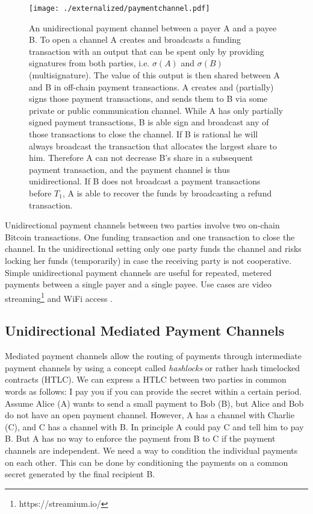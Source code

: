 \begin{figure}
\texttt{[image: ./externalized/paymentchannel.pdf]}
\caption{An unidirectional payment channel between a payer A and a payee B. To open a channel A creates and broadcasts a funding transaction with an output that can be spent only by providing signatures from both parties, i.e. $\sigma(A)$ and $\sigma(B)$ (multisignature). The value of this output is then shared between A and B in off-chain payment transactions. A creates and (partially) signs those payment transactions, and sends them to B via some private or public communication channel. While A has only partially signed payment transactions, B is able sign and broadcast any of those transactions to close the channel. If B is rational he will always broadcast the transaction that allocates the largest share to him. Therefore A can not decrease B's share in a subsequent payment transaction, and the payment channel is thus unidirectional. If B does not broadcast a payment transactions before $T_1$, A is able to recover the funds by broadcasting a refund transaction.}
\label{fig:paymentchannels}
\end{figure}

Unidirectional payment channels between two parties involve two on-chain Bitcoin transactions. One funding transaction and one transaction to close the channel. In the unidirectional setting only one party funds the channel and risks locking her funds (temporarily) in case the receiving party is not cooperative. Simple unidirectional payment channels are useful for repeated, metered payments between a single payer and a single payee. Use cases are video streaming\footnote{https://streamium.io/} and WiFi access \cite{Siby2013}.

\subsection{Unidirectional Mediated Payment Channels}

Mediated payment channels allow the routing of payments through intermediate payment channels by using a concept called \emph{hashlocks} or rather hash timelocked contracts (HTLC). We can express a HTLC between two parties in common words as follows: I pay you if you can provide the secret within a certain period. Assume Alice (A) wants to send a small payment to Bob (B), but Alice and Bob do not have an open payment channel. However, A has a channel with Charlie (C), and C has a channel with B. In principle A could pay C and tell him to pay B. But A has no way to enforce the payment from B to C if the payment channels are independent. We need a way to condition the individual payments on each other. This can be done by conditioning the payments on a common secret generated by the final recipient B. 

